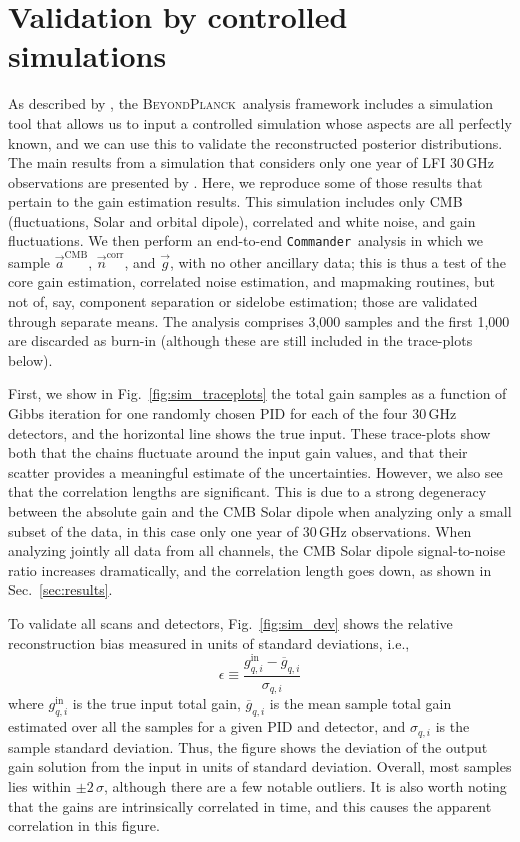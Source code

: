 \documentclass[twocolumn]{aa}
\def\commander{\texttt{Commander}}
\newcommand{\n}[0]{\vec{n}}
\renewcommand{\a}[0]{\vec{a}}
\newcommand{\g}[0]{\vec{g}}
\newcommand{\BP}{\textsc{BeyondPlanck}}
\begin{document}
\section{Validation by controlled simulations}

As described by \citet{bp04}, the \BP\ analysis framework includes a
simulation tool that allows us to input a controlled simulation whose
aspects are all perfectly known, and we can use this to validate the
reconstructed posterior distributions. The main results from a
simulation that considers only one year of LFI 30\,GHz observations
are presented by \citet{bp04}. Here, we reproduce some of those
results that pertain to the gain estimation results. This simulation
includes only CMB (fluctuations, Solar and orbital dipole), correlated
and white noise, and gain fluctuations. We then perform an end-to-end
\commander\ analysis in which we sample $\a^{\mathrm{CMB}}$,
$\n^{\mathrm{corr}}$, and $\g$, with no other ancillary data; this is
thus a test of the core gain estimation, correlated noise estimation,
and mapmaking routines, but not of, say, component separation or
sidelobe estimation; those are validated through separate means. The
analysis comprises 3,000 samples and the first 1,000 are discarded
as burn-in (although these are still included in the trace-plots
below).

First, we show in Fig.~\ref{fig:sim_traceplots} the total gain samples
as a function of Gibbs iteration for one randomly chosen PID for each
of the four 30\,GHz detectors, and the horizontal line shows the true
input. These trace-plots show both that the chains fluctuate around the
input gain values, and that their scatter provides a meaningful
estimate of the uncertainties. However, we also see that the
correlation lengths are significant. This is due to a strong
degeneracy between the absolute gain and the CMB Solar dipole when
analyzing only a small subset of the data, in this case only one year
of 30\,GHz observations. When analyzing jointly all data from all
channels, the CMB Solar dipole signal-to-noise ratio increases
dramatically, and the correlation length goes down, as shown in Sec.~\ref{sec:results}.

To validate all scans and detectors, Fig.~\ref{fig:sim_dev} shows the
relative reconstruction bias measured in units of standard deviations, i.e.,
\begin{equation}
  \epsilon \equiv \frac{g_{q, i}^{\mathrm{in}} - \overline{g}_{q, i}}{ \sigma_{q, i}}
\end{equation}
where $g_{q, i}^{\mathrm{in}}$ is the true input total gain, $\overline{g}_{q, i}$
is the mean sample total gain estimated over all the samples for a
given PID and detector, and $\sigma_{q, i}$ is the sample standard
deviation. Thus, the figure shows the deviation of the output gain
solution from the input in units of standard deviation. Overall, most
samples lies within $\pm2\,\sigma$, although there are a few notable
outliers. It is also worth noting that the gains are intrinsically
correlated in time, and this causes the apparent correlation in this
figure. 
\end{document}
